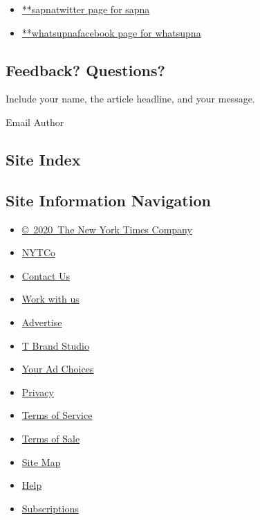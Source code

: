 \begin{itemize}
\tightlist
\item
  \href{https://twitter.com/sapna}{**sapnatwitter page for sapna}
\item
  \href{https://www.facebookcorewwwi.onion/whatsupna}{**whatsupnafacebook
  page for whatsupna}
\end{itemize}

\hypertarget{feedback-questions}{%
\subsection{Feedback? Questions?}\label{feedback-questions}}

Include your name, the article headline, and your message.

Email Author

\hypertarget{site-index}{%
\subsection{Site Index}\label{site-index}}

\hypertarget{site-information-navigation}{%
\subsection{Site Information
Navigation}\label{site-information-navigation}}

\begin{itemize}
\tightlist
\item
  \href{https://help.nytimes3xbfgragh.onion/hc/en-us/articles/115014792127-Copyright-notice}{©~2020~The
  New York Times Company}
\end{itemize}

\begin{itemize}
\tightlist
\item
  \href{https://www.nytco.com/}{NYTCo}
\item
  \href{https://help.nytimes3xbfgragh.onion/hc/en-us/articles/115015385887-Contact-Us}{Contact
  Us}
\item
  \href{https://www.nytco.com/careers/}{Work with us}
\item
  \href{https://nytmediakit.com/}{Advertise}
\item
  \href{http://www.tbrandstudio.com/}{T Brand Studio}
\item
  \href{https://www.nytimes3xbfgragh.onion/privacy/cookie-policy\#how-do-i-manage-trackers}{Your
  Ad Choices}
\item
  \href{https://www.nytimes3xbfgragh.onion/privacy}{Privacy}
\item
  \href{https://help.nytimes3xbfgragh.onion/hc/en-us/articles/115014893428-Terms-of-service}{Terms
  of Service}
\item
  \href{https://help.nytimes3xbfgragh.onion/hc/en-us/articles/115014893968-Terms-of-sale}{Terms
  of Sale}
\item
  \href{https://spiderbites.nytimes3xbfgragh.onion}{Site Map}
\item
  \href{https://help.nytimes3xbfgragh.onion/hc/en-us}{Help}
\item
  \href{https://www.nytimes3xbfgragh.onion/subscription?campaignId=37WXW}{Subscriptions}
\end{itemize}
